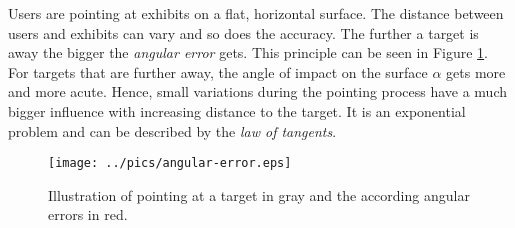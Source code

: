 Users are pointing at exhibits on a flat, horizontal surface. The distance between users and exhibits can vary and so does the accuracy. The further a target is away the bigger the \textit{angular error} gets. This principle can be seen in Figure \ref{fig:principle_angular_error}. For targets that are further away, the angle of impact on the surface $\alpha$ gets more and more acute. Hence, small variations during the pointing process have a much bigger influence with increasing distance to the target. It is an exponential problem and can be described by the \textit{law of tangents}. 
\begin{figure}[H]%
\texttt{[image: ../pics/angular-error.eps]}%
\caption{Illustration of pointing at a target in gray and the according angular errors in red.}%
\label{fig:principle_angular_error}%
\end{figure}

